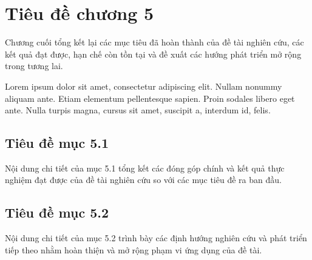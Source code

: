 
\chapter{Tiêu đề chương 5}
\label{chap:chapter_5}

Chương cuối tổng kết lại các mục tiêu đã hoàn thành của đề tài nghiên cứu, các kết quả đạt được, hạn chế còn tồn tại và đề xuất các hướng phát triển mở rộng trong tương lai.

Lorem ipsum dolor sit amet, consectetur adipiscing elit. Nullam nonummy aliquam ante. Etiam elementum pellentesque sapien. Proin sodales libero eget ante. Nulla turpis magna, cursus sit amet, suscipit a, interdum id, felis.

\section{Tiêu đề mục 5.1}
\label{sec:section_5_1}

Nội dung chi tiết của mục 5.1 tổng kết các đóng góp chính và kết quả thực nghiệm đạt được của đề tài nghiên cứu so với các mục tiêu đề ra ban đầu.

\section{Tiêu đề mục 5.2}
\label{sec:section_5_2}

Nội dung chi tiết của mục 5.2 trình bày các định hướng nghiên cứu và phát triển tiếp theo nhằm hoàn thiện và mở rộng phạm vi ứng dụng của đề tài.
